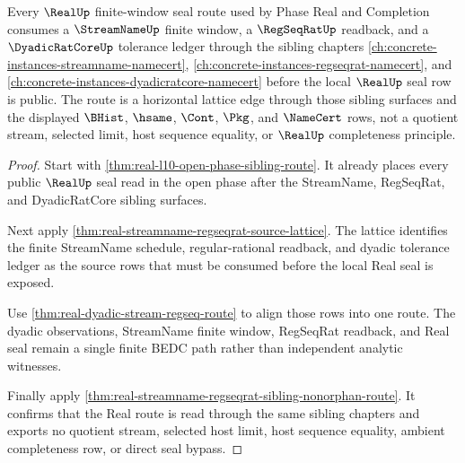\begin{theorem}
\label{thm:real-regseqrat-streamname-lattice-route}
Every $\RealUp$ finite-window seal route used by Phase Real and Completion consumes a $\StreamNameUp$ finite window, a $\RegSeqRatUp$ readback, and a $\DyadicRatCoreUp$ tolerance ledger through the sibling chapters \autoref{ch:concrete-instances-streamname-namecert}, \autoref{ch:concrete-instances-regseqrat-namecert}, and \autoref{ch:concrete-instances-dyadicratcore-namecert} before the local $\RealUp$ seal row is public. The route is a horizontal lattice edge through those sibling surfaces and the displayed $\BHist$, $\hsame$, $\Cont$, $\Pkg$, and $\NameCert$ rows, not a quotient stream, selected limit, host sequence equality, or $\RealUp$ completeness principle.
\end{theorem}
\begin{proof}
Start with \autoref{thm:real-l10-open-phase-sibling-route}. It already places every public $\RealUp$ seal read in the open phase after the StreamName, RegSeqRat, and DyadicRatCore sibling surfaces.

Next apply \autoref{thm:real-streamname-regseqrat-source-lattice}. The lattice identifies the finite StreamName schedule, regular-rational readback, and dyadic tolerance ledger as the source rows that must be consumed before the local Real seal is exposed.

Use \autoref{thm:real-dyadic-stream-regseq-route} to align those rows into one route. The dyadic observations, StreamName finite window, RegSeqRat readback, and Real seal remain a single finite BEDC path rather than independent analytic witnesses.

Finally apply \autoref{thm:real-streamname-regseqrat-sibling-nonorphan-route}. It confirms that the Real route is read through the same sibling chapters and exports no quotient stream, selected host limit, host sequence equality, ambient completeness row, or direct seal bypass.
\end{proof}
